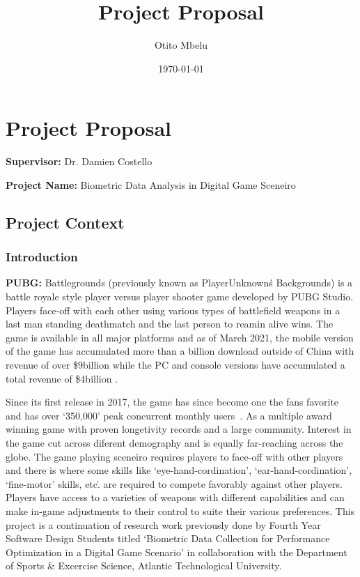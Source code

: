 \documentclass{report}
\title{Project Proposal}
\author{Otito Mbelu}
\date{\today}
\begin{document}
\setlength{\parindent}{0pt}
\maketitle

\chapter*{Project Proposal}
    \textbf{Supervisor:} Dr. Damien Costello \par
    \textbf{Project Name:} Biometric Data Analysis in Digital Game Sceneiro
    \section*{Project Context}
    \subsection*{Introduction}
    \par
    \textbf{PUBG:} Battlegrounds (previously known as PlayerUnknown\'s Backgrounds) is a battle royale style player versus
    player shooter game developed by PUBG Studio. Players face-off with each other using various types of battlefield weapons
    in a last man standing deathmatch and the last person to reamin alive wins. The game is available in all major platforms
    and as of March 2021, the mobile version of the game has accumulated more than a billion download outside of China with 
    revenue of over \$9billion while the PC and console versions have accumulated a total revenue of \$4billion
    \cite{statista}.
    \par 
    Since its first release in 2017, the game has since become one the fans favorite and has over `350,000' peak concurrent 
    monthly users~\cite{statista}. As a multiple award winning game with proven longetivity records and a large community.
    Interest in the game cut across diferent demography and is equally far-reaching across the globe. 
    The game playing sceneiro requires players to face-off with other players and there is where some skills like 
    `eye-hand-cordination', `ear-hand-cordination', `fine-motor' skills, etc\.. are required to compete favorably against 
    other players. Players have access to a varieties of weapons with different capabilities and can make in-game adjustments
    to their control to suite their various preferences. 
    This project is a continuation of research work previously done by Fourth Year Software Design Students titled `Biometric 
    Data Collection for Performance Optimization in a Digital Game Scenario' in collaboration with the Department of Sports
     \& Excercise Science, Atlantic Technological University.
\end{document}

